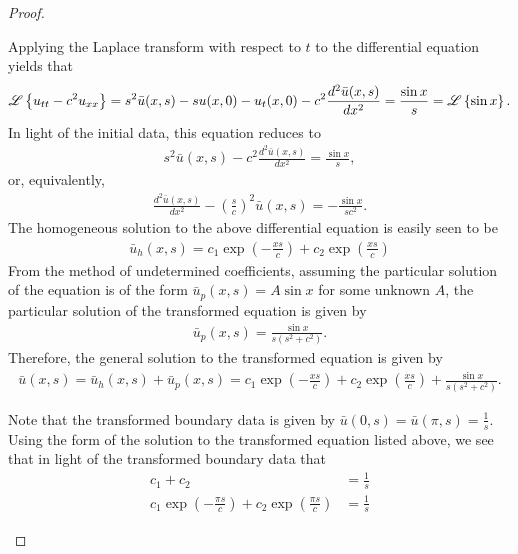 \begin{proof}
\begin{enumerate}
      Applying the Laplace transform with respect to $t$ to the differential equation yields that
      \begin{align*}
        \mathscr{L}\left\{ {u_{tt} - c^2 u_{xx}} \right\} = s^2 \bar{u}(x,s) -s u(x, 0) - u_t(x, 0) -c^2 \frac{d^2\bar{u}(x,s)}{dx^2} = \frac{\sin x}{s} = \mathscr{L}\left\{ {\sin x} \right\}.
      \end{align*}
      In light of the initial data, this equation reduces to
      \begin{align*}
        s^2 \bar{u}(x,s) -c^2 \frac{d^2\bar{u}(x,s)}{dx^2} = \frac{\sin x}{s},
      \end{align*}
      or, equivalently,
      \begin{align*}
        \frac{d^2\bar{u}(x,s)}{dx^2} - \left(\frac{s}{c}\right)^2 \bar{u}(x,s) = -\frac{\sin x}{sc^2}.
      \end{align*}
      The homogeneous solution to the above differential equation is easily seen to be
      \begin{align*}
        \bar{u}_h(x,s) = c_1 \exp{\left(-\frac{xs}{c}\right)} + c_2 \exp{\left(\frac{xs}{c}\right)}
      \end{align*}
      From the method of undetermined coefficients, assuming the particular solution of the equation is of the form $\bar{u}_p(x,s) = A \sin x$ for some unknown $A$,
      the particular solution of the transformed equation is given by
      \begin{align*}
        \bar{u}_p(x,s) = \frac{\sin x}{s(s^2+c^2)}.
      \end{align*}
      Therefore, the general solution to the transformed equation is given by
      \begin{align*}
        \bar{u}(x, s) = \bar{u}_h(x,s) + \bar{u}_p(x,s) = c_1 \exp{\left(-\frac{xs}{c}\right)} + c_2 \exp{\left(\frac{xs}{c}\right)} + \frac{\sin x}{s(s^2+c^2)}.
      \end{align*}

      Note that the transformed boundary data is given by $\displaystyle \bar{u}(0, s) = \bar{u}(\pi, s) = \frac{1}{s}$.
      Using the form of the solution to the transformed equation listed above, we see that in light of the transformed boundary data
      that
      \begin{align*}
        c_1 + c_2 &= \frac{1}{s} \\
        c_1 \exp{\left(-\frac{\pi s}{c}\right)} + c_2 \exp{\left(\frac{\pi s}{c}\right)} &= \frac{1}{s}
      \end{align*}


\end{enumerate}
\end{proof}
